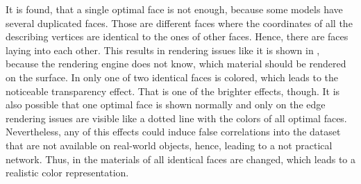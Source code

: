 It is found, that a single optimal face is not enough, because some models have several duplicated faces.
Those are different faces where the coordinates of all the describing vertices are identical to the ones of other faces.
Hence, there are faces laying into each other.
This results in rendering issues like it is shown in , because the rendering engine does not know, which material should be rendered on the surface.
In  only one of two identical faces is colored, which leads to the noticeable transparency effect.
That is one of the brighter effects, though.
It is also possible that one optimal face is shown normally and only on the edge rendering issues are visible like a dotted line with the colors of all optimal faces. 
Nevertheless, any of this effects could induce false correlations into the dataset that are not available on real-world objects, hence, leading to a not practical network.
Thus, in  the materials of all identical faces are changed, which leads to a realistic color representation.
